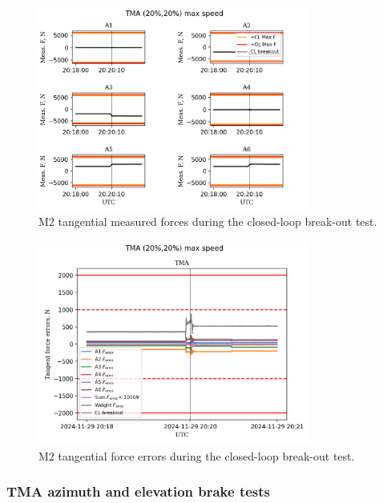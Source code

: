 \begin{figure}
    \centering
    \includegraphics[width=0.8\textwidth]{spa/20_vel_acc_jerk/BLOCK-T241_m2_tangent_measured_forces.png}
    \caption{M2 tangential measured forces during the closed-loop break-out test.}
    \label{fig:block241_m2_tangent_measured_forces}
    \end{figure}

\begin{figure}
    \centering
    \includegraphics[width=0.8\textwidth]{spa/20_vel_acc_jerk/BLOCK-T241_m2_tangent_force_errors.png}
    \caption{M2 tangential force errors during the closed-loop break-out test.}
    \label{fig:block241_m2_tangent_force_errors}
    \end{figure}


\subsubsection{TMA azimuth and elevation brake tests}
\label{subsubsec:tma_azimuth_and_elevation_brake_tests}

